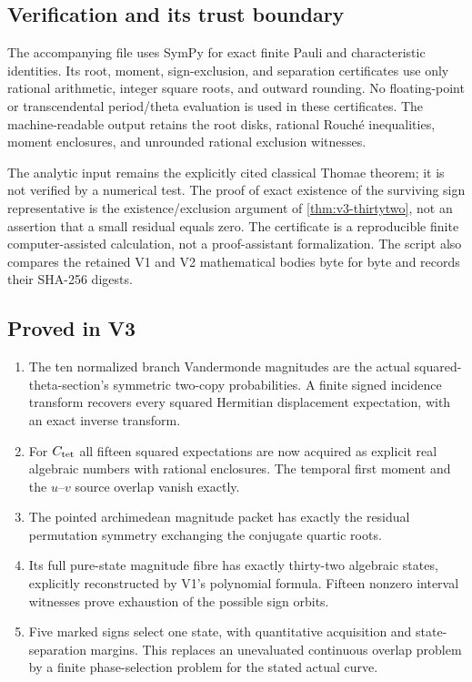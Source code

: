 \documentclass[11pt]{article}
\theoremstyle{definition}
\theoremstyle{remark}
\begin{document}
\subsection{Verification and its trust boundary}
The accompanying file
 uses SymPy
for exact finite Pauli and characteristic identities. Its root, moment,
sign-exclusion, and separation certificates use only rational arithmetic,
integer square roots, and outward rounding. No floating-point or
transcendental period/theta evaluation is used in these certificates. The
machine-readable output
retains the root disks, rational Rouch\'e inequalities, moment enclosures,
and unrounded rational exclusion witnesses.

The analytic input remains the explicitly cited classical Thomae theorem;
it is not verified by a numerical test. The proof of exact existence of the
surviving sign representative is the existence/exclusion argument of
\cref{thm:v3-thirtytwo}, not an assertion that a small residual equals zero.
The certificate is a reproducible finite computer-assisted calculation, not
a proof-assistant formalization. The script also compares the retained V1
and V2 mathematical bodies byte for byte and records their SHA-256 digests.

\subsection{Proved in V3}
\begin{enumerate}[label=\textup{(P3.\arabic*)},leftmargin=3.6em]
\item The ten normalized branch Vandermonde magnitudes are the actual
squared-theta-section's symmetric two-copy probabilities. A finite signed
incidence transform recovers every squared Hermitian displacement
expectation, with an exact inverse transform.
\item For $C_{\rm tet}$ all fifteen squared expectations are now acquired as
explicit real algebraic numbers with rational enclosures. The temporal
first moment and the $u$--$v$ source overlap vanish exactly.
\item The pointed archimedean magnitude packet has exactly the residual
permutation symmetry exchanging the conjugate quartic roots.
\item Its full pure-state magnitude fibre has exactly thirty-two algebraic
states, explicitly reconstructed by V1's polynomial formula. Fifteen
nonzero interval witnesses prove exhaustion of the possible sign orbits.
\item Five marked signs select one state, with quantitative acquisition and
state-separation margins. This replaces an unevaluated continuous overlap
problem by a finite phase-selection problem for the stated actual curve.
\end{enumerate}
\end{document}

